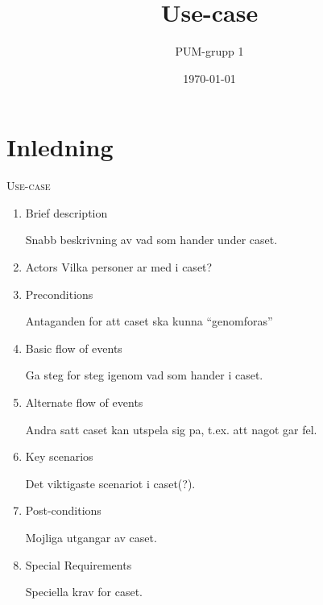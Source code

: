 

\ifpdf
\else
\fi

\title{Use-case}
\author{PUM-grupp 1}
\date{\today}



\maketitle\thispagestyle{empty}

\newpage

\section{Inledning}
\textsc{\LARGE Use-case}

\begin{enumerate}
	\item Brief description
	
	Snabb beskrivning av vad som hander under caset.
	\item Actors
	Vilka personer ar med i caset?
	
	\item Preconditions
	
	Antaganden for att caset ska kunna "`genomforas"'
	\item Basic flow of events
	
	Ga steg for steg igenom vad som hander i caset.
	\item Alternate flow of events
	
	Andra satt caset kan utspela sig pa, t.ex. att nagot gar fel.
	\item Key scenarios
	
	Det viktigaste scenariot i caset(?).
	\item Post-conditions
	
	Mojliga utgangar av caset.
	\item Special Requirements
	
	Speciella krav for caset.
\end{enumerate}


